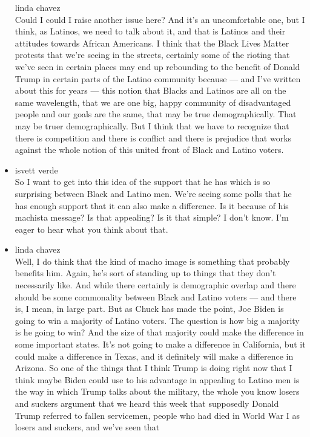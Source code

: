 \begin{itemize}
  linda chavez\\
  Could I could I raise another issue here? And it's an uncomfortable
  one, but I think, as Latinos, we need to talk about it, and that is
  Latinos and their attitudes towards African Americans. I think that
  the Black Lives Matter protests that we're seeing in the streets,
  certainly some of the rioting that we've seen in certain places may
  end up rebounding to the benefit of Donald Trump in certain parts of
  the Latino community because --- and I've written about this for years
  --- this notion that Blacks and Latinos are all on the same
  wavelength, that we are one big, happy community of disadvantaged
  people and our goals are the same, that may be true demographically.
  That may be truer demographically. But I think that we have to
  recognize that there is competition and there is conflict and there is
  prejudice that works against the whole notion of this united front of
  Black and Latino voters.
\item
  isvett verde\\
  So I want to get into this idea of the support that he has which is so
  surprising between Black and Latino men. We're seeing some polls that
  he has enough support that it can also make a difference. Is it
  because of his machista message? Is that appealing? Is it that simple?
  I don't know. I'm eager to hear what you think about that.
\item
  linda chavez\\
  Well, I do think that the kind of macho image is something that
  probably benefits him. Again, he's sort of standing up to things that
  they don't necessarily like. And while there certainly is demographic
  overlap and there should be some commonality between Black and Latino
  voters --- and there is, I mean, in large part. But as Chuck has made
  the point, Joe Biden is going to win a majority of Latino voters. The
  question is how big a majority is he going to win? And the size of
  that majority could make the difference in some important states. It's
  not going to make a difference in California, but it could make a
  difference in Texas, and it definitely will make a difference in
  Arizona. So one of the things that I think Trump is doing right now
  that I think maybe Biden could use to his advantage in appealing to
  Latino men is the way in which Trump talks about the military, the
  whole you know losers and suckers argument that we heard this week
  that supposedly Donald Trump referred to fallen servicemen, people who
  had died in World War I as losers and suckers, and we've seen that

\end{itemize}

